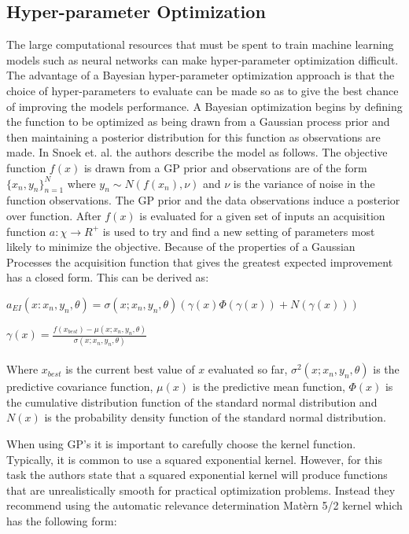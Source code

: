 \documentclass[12pt,letterpaper]{article}
\begin{document}
\subsection{Hyper-parameter Optimization}
The large computational resources that must be spent to train machine learning models such as neural networks can make hyper-parameter optimization difficult.  The advantage of a Bayesian hyper-parameter optimization approach is that the choice of hyper-parameters to evaluate can be made so as to give the best chance of improving the models performance. A Bayesian optimization begins by defining the function to be optimized as being drawn from a Gaussian process prior and then maintaining a posterior distribution for this function as observations are made. In Snoek et. al. \cite{Snoek:2012:PBO:2999325.2999464} the authors describe the model as follows.  The objective function $f(x)$ is drawn from a GP prior and observations are of the form $\{x_n,y_n\}_{n=1}^N$ where $y_n \sim N(f(x_n), \nu)$ and $\nu$ is the variance of noise in the function observations.  The GP prior and the data observations induce a posterior over function. After $f(x)$ is evaluated for a given set of inputs an acquisition function $a : \chi \rightarrow R^+$ is used to try and find a new setting of parameters most likely to minimize the objective.  Because of the properties of a Gaussian Processes the acquisition function that gives the greatest expected improvement has a closed form.  This can be derived as:

$a_{EI}(x:{x_n,y_n}, \theta)= \sigma(x;{x_n,y_n},\theta) (\gamma(x) \Phi(\gamma(x)) + N(\gamma(x)))$


$\gamma(x) = \frac{f(x_{best}) - \mu(x;{x_n,y_n}, \theta)}{\sigma(x;{x_n,y_n},\theta)}$
\\
\\
Where $x_{best}$ is the current best value of $x$ evaluated so far, $\sigma^2(x;{x_n,y_n},\theta)$ is the predictive covariance function, $\mu(x)$ is the predictive mean function, $\Phi(x)$ is the cumulative distribution function of the standard normal distribution and $N(x)$ is the probability density function of the standard normal distribution.

When using GP's it is important to carefully choose the kernel function.  Typically, it is common to use a squared exponential kernel.  However, for this task the authors state that a squared exponential kernel will produce functions that are unrealistically smooth for practical optimization problems.  Instead they recommend using the automatic relevance determination Mat\`ern 5/2 kernel which has the following form:
\end{document}
